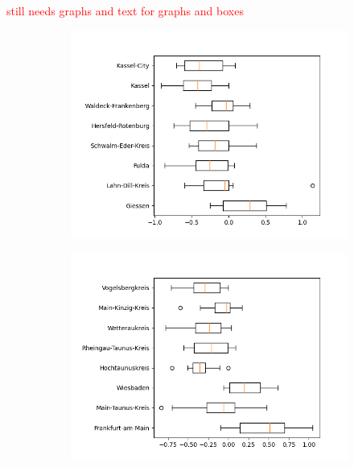 \textcolor{red}{still needs graphs and text for graphs and boxes}

\begin{figure}
	\centering
	\begin{subfigure}[b]{0.4\textwidth}
		\centering
		\includegraphics[width=\textwidth]{./figures/50d/deviation_box50_alt1.png}	
	\end{subfigure}
	\begin{subfigure}[b]{0.4\textwidth}
		\centering
		\includegraphics[width=\textwidth]{./figures/50d/deviation_box50_alt2.png}	
	\end{subfigure}
	\begin{subfigure}[b]{0.4\textwidth}
		\centering

\end{subfigure}
\end{figure}
